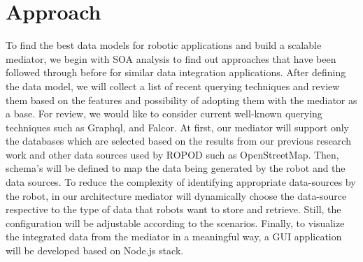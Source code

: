 

	\let\cleardoublepage\clearpage
\chapter{Approach}
To find the best data models for robotic applications and build a scalable mediator, we begin with SOA analysis to find out approaches that have been followed through before for similar data integration applications. After defining the data model, we will collect a list of recent querying techniques and review them based on the features and possibility of adopting them with the mediator as a base.  For review, we would like to consider current well-known querying techniques such as Graphql, and Falcor. At first, our mediator will support only the databases which are selected based on the results from our previous research work \cite{ravichandranworkbench} and other data sources used by ROPOD such as OpenStreetMap. Then, schema's will be defined to map the data being generated by the robot and the data sources. To reduce the complexity of identifying appropriate data-sources by the robot, in our architecture mediator will dynamically choose the data-source respective to the type of data that robots want to store and retrieve. Still, the configuration will be adjustable according to the scenarios. Finally, to visualize the integrated data from the mediator in a meaningful way, a GUI application will be developed based on Node.js stack.

